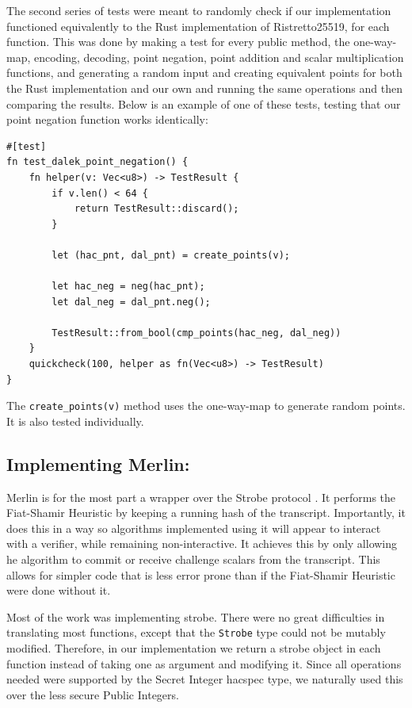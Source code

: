 \documentclass{article}
\begin{document}
The second series of tests were meant to randomly check if our 
implementation functioned equivalently to the Rust implementation of 
Ristretto25519, for each function. This was done by making a test for 
every public method, the one-way-map, encoding, decoding, point negation, 
point addition and scalar multiplication functions, and generating a 
random input and creating equivalent points for both the Rust 
implementation and our own and running the same operations and then 
comparing the results.
Below is an example of one of these tests, testing that our point 
negation function works identically:

\begin{lstlisting}
#[test]
fn test_dalek_point_negation() {
    fn helper(v: Vec<u8>) -> TestResult {
        if v.len() < 64 {
            return TestResult::discard();
        }

        let (hac_pnt, dal_pnt) = create_points(v);

        let hac_neg = neg(hac_pnt);
        let dal_neg = dal_pnt.neg();

        TestResult::from_bool(cmp_points(hac_neg, dal_neg))
    }
    quickcheck(100, helper as fn(Vec<u8>) -> TestResult)
}
\end{lstlisting}

The \texttt{create\_points(v)} method uses the one-way-map to generate 
random points. It is also tested individually.


\subsection{Implementing Merlin:} \label{implementing-merlin}

Merlin \cite{merlin} is for the most part a wrapper over the Strobe
protocol \cite{strobe}. It performs the Fiat-Shamir Heuristic by
keeping a running hash of the transcript. Importantly, it does this
in a way so algorithms implemented using it will appear to interact
with a verifier, while remaining non-interactive. It achieves this
by only allowing he algorithm to commit or receive challenge scalars
from the transcript. This allows for simpler code that is less error
prone than if the Fiat-Shamir Heuristic were done without it.

Most of the work was implementing strobe. There were no great
difficulties in translating most functions, except that the
\texttt{Strobe} type could not be mutably modified. Therefore, in our
implementation we return a strobe object in each function instead
of taking one as argument and modifying it. Since all operations needed
were supported by the Secret Integer hacspec type, we naturally used
this over the less secure Public Integers.
\end{document}
